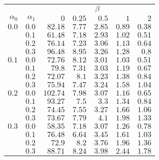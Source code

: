 \begin{tabular}{rr|rrrrr}
\hline\hline
 && \multicolumn{5}{c}{$\beta$}\\
 $\alpha_0$ & $\alpha_1$ & $0$ & $0.25$ & $0.5$ & $1$ & $2$ \\ 
 \hline
$0.0$ & $0.0$ & $82.18$ & $7.77$ & $2.85$ & $0.89$ & $0.38$\\ 
 & $0.1$ & $61.48$ & $7.18$ & $2.93$ & $1.02$ & $0.51$\\ 
 & $0.2$ & $76.14$ & $7.23$ & $3.06$ & $1.13$ & $0.64$\\ 
 & $0.3$ & $96.48$ & $8.95$ & $3.26$ & $1.28$ & $0.8$\\ 
\hline 
 $0.1$ & $0.0$ & $72.76$ & $8.12$ & $3.01$ & $1.03$ & $0.51$\\ 
 & $0.1$ & $79.8$ & $7.31$ & $3.03$ & $1.19$ & $0.67$\\ 
 & $0.2$ & $72.07$ & $8.1$ & $3.23$ & $1.38$ & $0.84$\\ 
 & $0.3$ & $75.94$ & $7.47$ & $3.24$ & $1.58$ & $1.04$\\ 
\hline 
 $0.2$ & $0.0$ & $102.74$ & $7.98$ & $3.07$ & $1.16$ & $0.65$\\ 
 & $0.1$ & $93.27$ & $7.5$ & $3.3$ & $1.34$ & $0.84$\\ 
 & $0.2$ & $74.45$ & $7.55$ & $3.27$ & $1.66$ & $1.06$\\ 
 & $0.3$ & $73.67$ & $7.79$ & $4.1$ & $1.98$ & $1.33$\\ 
\hline 
 $0.3$ & $0.0$ & $58.35$ & $7.18$ & $3.07$ & $1.26$ & $0.78$\\ 
 & $0.1$ & $76.48$ & $6.64$ & $3.45$ & $1.61$ & $1.03$\\ 
 & $0.2$ & $72.9$ & $8.2$ & $3.76$ & $1.96$ & $1.36$\\ 
 & $0.3$ & $88.71$ & $8.24$ & $3.98$ & $2.44$ & $1.78$\\ 
 \hline 
 \end{tabular}